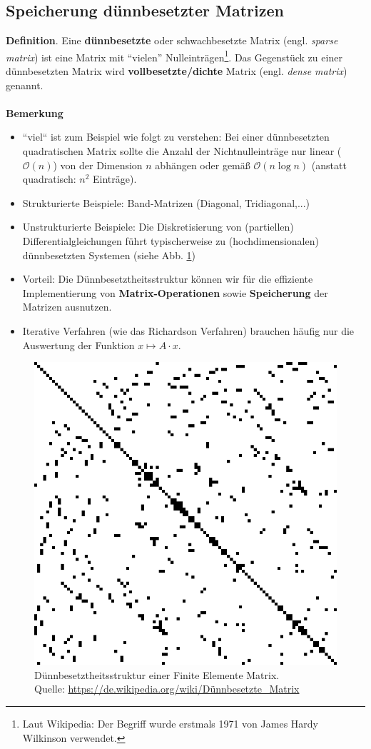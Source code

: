 \subsection{Speicherung dünnbesetzter Matrizen} \label{sec:sparseMatrix}
\textbf{Definition}.
Eine \textbf{dünnbesetzte} oder schwachbesetzte Matrix (engl. \textit{sparse matrix}) ist eine Matrix mit ``vielen'' Nulleinträgen\footnote{Laut Wikipedia: Der Begriff wurde erstmals 1971 von James Hardy Wilkinson verwendet.}. Das Gegenstück zu einer dünnbesetzten Matrix wird \textbf{vollbesetzte/dichte} Matrix (engl. \textit{dense matrix}) genannt.
~\\~\\
\textbf{Bemerkung}
\begin{itemize}
	\item ``viel`` ist zum Beispiel wie folgt zu verstehen: Bei einer dünnbesetzten quadratischen Matrix sollte die Anzahl der Nichtnulleinträge nur linear ($\mathcal{O}(n)$) von der Dimension $n$ abhängen oder gemäß $\mathcal{O}(n\log n)$ (anstatt quadratisch: $n^2$ Einträge).
	\item Strukturierte Beispiele: Band-Matrizen (Diagonal, Tridiagonal,...)
	\item Unstrukturierte Beispiele: Die Diskretisierung von (partiellen) Differentialgleichungen führt typischerweise zu (hochdimensionalen) dünnbesetzten Systemen (siehe Abb. \ref{fig:sparseFEM})
	\item Vorteil: Die Dünnbesetztheitsstruktur können wir für die effiziente Implementierung von \textbf{Matrix-Operationen} sowie \textbf{Speicherung} der Matrizen ausnutzen.
	\item Iterative Verfahren (wie das Richardson Verfahren) brauchen häufig nur die Auswertung der Funktion $x \mapsto A\cdot x$. %
\end{itemize}
\begin{figure}[h!]
	\centering
		\includegraphics[width=0.4\linewidth]{./media//sparse_matrix}
		\caption[Dünnbesetztheitsstruktur]{Dünnbesetztheitsstruktur einer Finite Elemente Matrix.\\ Quelle: \url{https://de.wikipedia.org/wiki/Dünnbesetzte_Matrix}}
		\label{fig:sparseFEM}
\end{figure}
